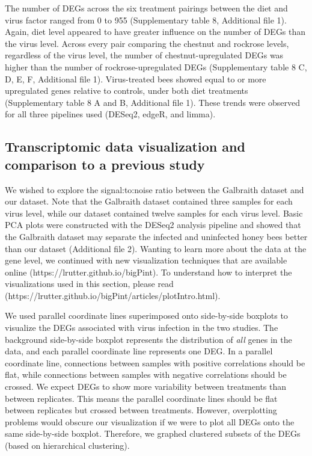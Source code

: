 \documentclass{bmcart}
\begin{document}
\begin{linenumbers}
\begin{doublespacing}
The number of DEGs across the six treatment pairings between the diet and virus factor ranged from 0 to 955 (Supplementary table 8, Additional file 1). Again, diet level appeared to have greater influence on the number of DEGs than the virus level. Across every pair comparing the chestnut and rockrose levels, regardless of the virus level, the number of chestnut-upregulated DEGs was higher than the number of rockrose-upregulated DEGs (Supplementary table 8 C, D, E, F, Additional file 1). Virus-treated bees showed equal to or more upregulated genes relative to controls, under both diet treatments (Supplementary table 8 A and B, Additional file 1). These trends were observed for all three pipelines used (DESeq2, edgeR, and limma).

\subsection*{Transcriptomic data visualization and comparison to a previous study}

We wished to explore the signal:to:noise ratio between the Galbraith dataset and our dataset. Note that the Galbraith dataset contained three samples for each virus level, while our dataset contained twelve samples for each virus level. Basic PCA plots were constructed with the DESeq2 analysis pipeline and showed that the Galbraith dataset may separate the infected and uninfected honey bees better than our dataset (Additional file 2). Wanting to learn more about the data at the gene level, we continued with new visualization techniques that are available online (https://lrutter.github.io/bigPint). To understand how to interpret the visualizations used in this section, please read (https://lrutter.github.io/bigPint/articles/plotIntro.html).

We used parallel coordinate lines superimposed onto side-by-side boxplots to visualize the DEGs associated with virus infection in the two studies. The background side-by-side boxplot represents the distribution of \textit{all} genes in the data, and each parallel coordinate line represents one DEG. In a parallel coordinate line, connections between samples with positive correlations should be flat, while connections between samples with negative correlations should be crossed. We expect DEGs to show more variability between treatments than between replicates. This means the parallel coordinate lines should be flat between replicates but crossed between treatments. However, overplotting problems would obscure our visualization if we were to plot all DEGs onto the same side-by-side boxplot. Therefore, we graphed clustered subsets of the DEGs (based on hierarchical clustering).


\end{doublespacing}
\end{linenumbers}
\end{document}
